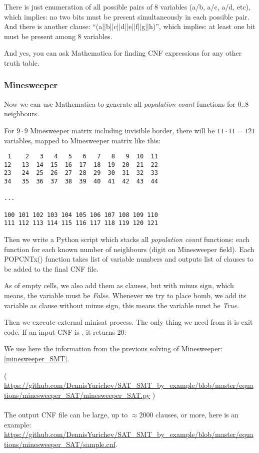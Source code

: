 There is just enumeration of all possible pairs of 8 variables (a/b, a/c, a/d, etc), which implies:
no two bits must be present simultaneously in each possible pair.
And there is another clause: ``(a||b||c||d||e||f||g||h)'', which implies:
at least one bit must be present among 8 variables.

And yes, you can ask Mathematica for finding \ac{CNF} expressions for any other truth table.

\subsubsection{Minesweeper}

Now we can use Mathematica to generate all \textit{population count} functions for 0..8 neighbours.

For $9 \cdot 9$ Minesweeper matrix including invisible border, there will be $11 \cdot 11=121$ variables,
mapped to Minesweeper matrix like this:

\begin{lstlisting}
 1    2   3   4   5   6   7   8   9  10  11
12   13  14  15  16  17  18  19  20  21  22
23   24  25  26  27  28  29  30  31  32  33
34   35  36  37  38  39  40  41  42  43  44

...

100 101 102 103 104 105 106 107 108 109 110
111 112 113 114 115 116 117 118 119 120 121
\end{lstlisting}

Then we write a Python script which stacks all \textit{population count} functions:
each function for each known number of neighbours (digit on Minesweeper field).
Each POPCNTx() function takes list of variable numbers and outputs list of clauses to be added to the final \ac{CNF} file.

As of empty cells, we also add them as clauses, but with minus sign, which means, the variable must be \textit{False}.
Whenever we try to place bomb, we add its variable as clause without minus sign, this means the variable must be \textit{True}.

Then we execute external minisat process.
The only thing we need from it is exit code.
If an input \ac{CNF} is , it returns 20:

We use here the information from the previous solving of Minesweeper: \ref{minesweeper_SMT}.



( \url{https://github.com/DennisYurichev/SAT_SMT_by_example/blob/master/equations/minesweeper_SAT/minesweeper_SAT.py} ) \\
\\
The output \ac{CNF} file can be large, up to $\approx 2000$ clauses, or more, here is an example:
\url{https://github.com/DennisYurichev/SAT_SMT_by_example/blob/master/equations/minesweeper_SAT/sample.cnf}.

